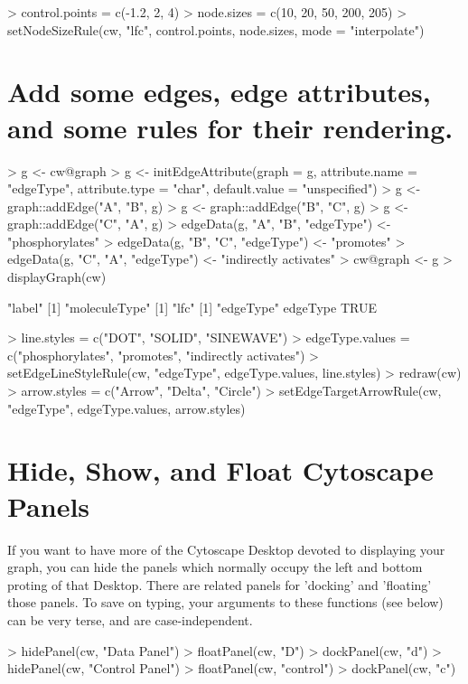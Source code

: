 \documentclass[12pt]{article}
\begin{document}
\begin{Schunk}
\begin{Sinput}
> control.points = c(-1.2, 2, 4)
> node.sizes = c(10, 20, 50, 200, 205)
> setNodeSizeRule(cw, "lfc", control.points, node.sizes, mode = "interpolate")
\end{Sinput}
\end{Schunk}
\section{Add some edges, edge attributes, and some rules for their rendering.}
\begin{Schunk}
\begin{Sinput}
> g <- cw@graph
> g <- initEdgeAttribute(graph = g, attribute.name = "edgeType", attribute.type = "char", default.value = "unspecified")
> g <- graph::addEdge("A", "B", g)
> g <- graph::addEdge("B", "C", g)
> g <- graph::addEdge("C", "A", g)
> edgeData(g, "A", "B", "edgeType") <- "phosphorylates"
> edgeData(g, "B", "C", "edgeType") <- "promotes"
> edgeData(g, "C", "A", "edgeType") <- "indirectly activates"
> cw@graph <- g
> displayGraph(cw)
\end{Sinput}
\begin{Soutput}
[1] "label"
[1] "moleculeType"
[1] "lfc"
[1] "edgeType"
edgeType 
    TRUE 
\end{Soutput}
\begin{Sinput}
> line.styles = c("DOT", "SOLID", "SINEWAVE")
> edgeType.values = c("phosphorylates", "promotes", "indirectly activates")
> setEdgeLineStyleRule(cw, "edgeType", edgeType.values, line.styles)
> redraw(cw)
> arrow.styles = c("Arrow", "Delta", "Circle")
> setEdgeTargetArrowRule(cw, "edgeType", edgeType.values, arrow.styles)
\end{Sinput}
\end{Schunk}

\section{Hide, Show, and Float Cytoscape Panels}
If you want to have more of the Cytoscape Desktop devoted to displaying your graph, you can hide the panels which normally occupy the left and bottom proting of that Desktop.  There are related panels for 'docking' and 'floating' those panels.  To save on typing, your arguments to these functions (see below) can be very terse, and are case-independent.
\begin{Schunk}
\begin{Sinput}
> hidePanel(cw, "Data Panel")
> floatPanel(cw, "D")
> dockPanel(cw, "d")
> hidePanel(cw, "Control Panel")
> floatPanel(cw, "control")
> dockPanel(cw, "c")
\end{Sinput}
\end{Schunk}
\end{document}
